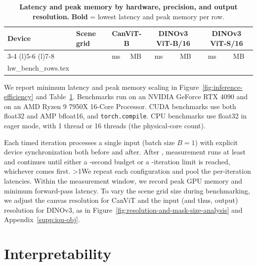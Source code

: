 \documentclass{article}
\makeatletter
\newcommand{\inputrows}[1]{\@@input #1 }
\makeatother
\begin{document}
\begin{table}[h]
  \caption{\textbf{Latency and peak memory by hardware, precision, and output resolution.}
  \protect\newline\textbf{Bold} = lowest latency and peak memory per row.}
  \label{tab:hw-bench}
  \centering
  \footnotesize%
  \setlength{\tabcolsep}{4pt}%
  \setlength{\aboverulesep}{1pt}\setlength{\belowrulesep}{1pt}%
  \begin{tabular}{llcccccc}
    \toprule
    \multirow{2}{*}{\textbf{Device}} & \multirow{2}{*}{\textbf{Scene grid}}
      & \multicolumn{2}{c}{\textbf{CanViT-B}}
      & \multicolumn{2}{c}{\textbf{DINOv3 ViT-B/16}}
      & \multicolumn{2}{c}{\textbf{DINOv3 ViT-S/16}} \\
    \cmidrule(l){3-4} \cmidrule(l){5-6} \cmidrule(l){7-8}
    & & ms & MB & ms & MB & ms & MB \\
    \midrule
    \inputrows{hw_bench_rows.tex}
    \bottomrule
  \end{tabular}
\end{table}

We report minimum latency and peak memory scaling in Figure~\ref{fig:inference-efficiency} and Table~\ref{tab:hw-bench}.
Benchmarks run on an NVIDIA GeForce RTX 4090 and on an AMD Ryzen 9 7950X 16-Core Processor.
CUDA benchmarks use both float32 and AMP bfloat16, and \texttt{torch.compile}.
CPU benchmarks use float32 in eager mode, with 1 thread or 16 threads (the physical-core count).

Each timed iteration processes a single input (batch size $B = 1$) with explicit device synchronization both before and after.
After \benchWarmupItersPhrase{}, measurement runs at least \benchMinItersPhrase{} and continues until either a \benchTimeBudgetS{}-second budget or a \benchMaxIters{}-iteration limit is reached, whichever comes first.
\ifnum\benchNPasses>1\relax We repeat each configuration \benchNPassesPhrase{} and pool the per-iteration latencies. \fi
Within the measurement window, we record peak GPU memory and minimum forward-pass latency.
To vary the scene grid size during benchmarking, we adjust the canvas resolution for CanViT and the input (and thus, output) resolution for DINOv3, as in Figure~\ref{fig:resolution-and-mask-size-analysis} and Appendix~\ref{supp:iou-obj}.

\FloatBarrier
\section{Interpretability}
\label{supp:interpretability}
\end{document}
